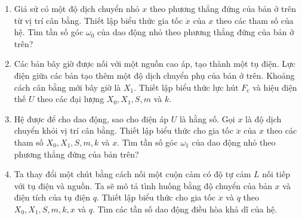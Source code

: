 \begin{vd}
\begin{enumerate}[1)]
    \item Giả sử có một độ dịch chuyển nhỏ $x$ theo phương thẳng đứng của bản ở trên từ vị trí cân bằng. Thiết lập biểu thức gia tốc $\ddot{x}$ của $x$ theo các tham số của hệ. Tìm tần số góc $\omega_{0}$ của dao động nhỏ theo phương thẳng đứng của bản ở trên?
    \item Các bản bây giờ được nối với một nguồn cao áp, tạo thành một tụ điện. Lực điện giữa các bản tạo thêm một độ dịch chuyển phụ của bản ở trên. Khoảng cách cân bằng mới bây giờ là $X_{1}$. Thiết lập biểu thức lực hút $F_{e}$ và hiệu điện thế $U$ theo các đại lượng $X_{0}, X_{1}, S, m$ và $k$.
    \item Hệ được để cho dao động, sao cho điện áp $U$ là hằng số. Gọi $x$ là độ dịch chuyển khỏi vị trí cân bằng. Thiết lập biểu thức cho gia tốc $\ddot{x}$ của $x$ theo các tham số $X_{0}, X_{1}, S, m, k$ và $x$. Tìm tần số góc $\omega_{1}$ của dao động nhỏ theo phương thẳng đứng của bản trên?
    \item Ta thay đổi một chút bằng cách nối một cuộn cảm có độ tự cảm $L$ nối tiếp với tụ điện và nguồn. Ta sẽ mô tả tình huống bằng độ chuyển của bản $x$ và điện tích của tụ điện $q$. Thiết lập biểu thức cho gia tốc $\ddot{x}$ và $\ddot{q}$ theo $X_{0}, X_{1}, S, m, k, x$ và $q$. Tìm các tần số dao động điều hòa khả dĩ của hệ.
\end{enumerate}
\end{vd}
